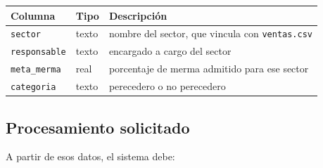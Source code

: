 \documentclass[12pt]{article}
\newcommand{\codigo}[1]{\texttt{\small #1}}
\begin{document}
\begin{center}
\begin{tabular}{lll}
    \toprule
    \textbf{Columna} & \textbf{Tipo} & \textbf{Descripción} \\
    \midrule
    \codigo{sector}       & texto & nombre del sector, que vincula con \codigo{ventas.csv} \\
    \codigo{responsable}  & texto & encargado a cargo del sector \\
    \codigo{meta\_merma}  & real  & porcentaje de merma admitido para ese sector \\
    \codigo{categoria}    & texto & perecedero o no perecedero \\
    \bottomrule
\end{tabular}
\end{center}

\newpage
\subsection{Procesamiento solicitado}

A partir de esos datos, el sistema debe:
\end{document}
